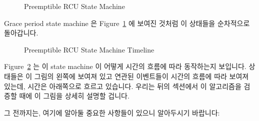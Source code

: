 \begin{figure}[htb]
\centering
{}
\caption{Preemptible RCU State Machine}
\label{app:rcuimpl:Preemptible RCU State Machine}
\end{figure}

Grace period state machine 은
Figure~\ref{app:rcuimpl:Preemptible RCU State Machine}
에 보여진 것처럼 이 상태들을 순차적으로 돌아갑니다.

\begin{figure}[htb]
\centering
{}
\caption{Preemptible RCU State Machine Timeline}
\label{app:rcuimpl:Preemptible RCU State Machine Timeline}
\end{figure}

Figure~\ref{app:rcuimpl:Preemptible RCU State Machine Timeline}
는 이 state machine 이 어떻게 시간의 흐름에 따라 동작하는지 보입니다.
상태들은 이 그림의 왼쪽에 보여져 있고 연관된 이벤트들이 시간의 흐름에 따라
보여져 있는데, 시간은 아래쪽으로 흐르고 있습니다.
우리는 뒤의 섹션에서 이 알고리즘을 검증할 때에 이 그림을 상세히 설명할 겁니다.

그 전까지는, 여기에 알아둘 중요한 사항들이 있으니 알아두시기 바랍니다:

